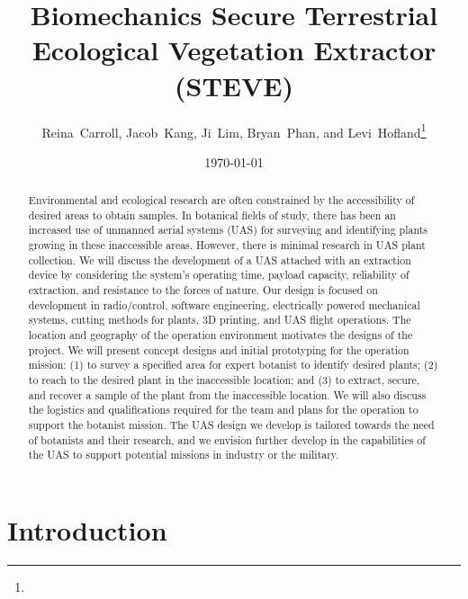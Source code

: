 \documentclass{wrcecapstone}
\title{Biomechanics Secure Terrestrial {\nobreak Ecological} Vegetation Extractor (STEVE)}
\author{Reina~Carroll, Jacob~Kang, Ji~Lim, Bryan~Phan, and Levi~Hofland\thanks{}}
\date{\today}
\begin{document}
\maketitlepage
\cleardoublepage
\tableofcontents
\listoffigures
\listoftables

\clearpage
\maketitle


\begin{abstract}
Environmental and ecological research are often constrained by the accessibility of desired areas to obtain samples. In botanical fields of study, there has been an increased use of unmanned aerial systems (UAS) for surveying and identifying plants growing in these inaccessible areas. However, there is minimal research in UAS plant collection. We will discuss the development of a UAS attached with an extraction device by considering the system’s operating time, payload capacity, reliability of extraction, and resistance to the forces of nature. Our design is focused on development in radio/control, software engineering, electrically powered mechanical systems, cutting methods for plants, 3D printing, and UAS flight operations. The location and geography of the operation environment motivates the designs of the project. We will present concept designs and initial prototyping for the operation mission: (1) to survey a specified area for expert botanist to identify desired plants; (2) to reach to the desired plant in the inaccessible location; and (3) to extract, secure, and recover a sample of the plant from the inaccessible location. We will also discuss the logistics and qualifications required for the team and plans for the operation to support the botanist mission. The UAS design we develop is tailored towards the need of botanists and their research, and we envision further develop in the capabilities of the UAS to support potential missions in industry or the military.
\end{abstract}

\section{Introduction}
\end{document}
